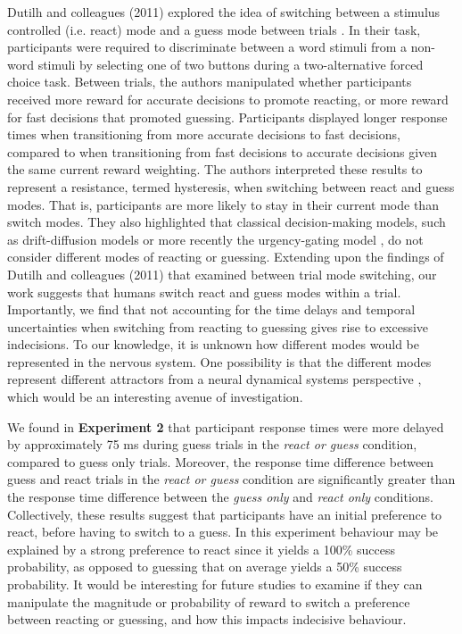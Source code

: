 \documentclass[man,donotrepeattitle,floatsintext,letterpaper,12pt]{apa7}
\newcommand\boldblue[1]{\textcolor{mydarkblue}{\textbf{#1}}}
\begin{document}
Dutilh and colleagues (2011) explored the idea of switching between a stimulus controlled (i.e. react) mode and a guess mode between trials \autocite{dutilhPhaseTransitionModel2011}. In their task, participants were required to discriminate between a word stimuli from a non-word stimuli by selecting one of two buttons during a two-alternative forced choice task. Between trials, the authors manipulated whether participants received more reward for accurate decisions to promote reacting, or more reward for fast decisions that promoted guessing. Participants displayed longer response times when transitioning from more accurate decisions to fast decisions, compared to when transitioning from fast decisions to accurate decisions given the same current reward weighting. The authors interpreted these results to represent a resistance, termed hysteresis, when switching between react and guess modes. That is, participants are more likely to stay in their current mode than switch modes. They also highlighted that classical decision-making models, such as drift-diffusion models \autocite{ratcliffModeling2alternativeForcedchoice2018} or more recently the urgency-gating model \autocite{cisekDecisionsChangingConditions2009,derosiereTradingAccuracySpeed2021,thuraDecisionMakingUrgency2012}, do not consider different modes of reacting or guessing. Extending upon the findings of Dutilh and colleagues (2011) that examined between trial mode switching, our work suggests that humans switch react and guess modes within a trial. Importantly, we find that not accounting for the time delays and temporal uncertainties when switching from reacting to guessing gives rise to excessive indecisions. To our knowledge, it is unknown how different modes would be represented in the nervous system. One possibility is that the different modes represent different attractors from a neural dynamical systems perspective \autocite{erlhagenDynamicFieldTheory2002,wangDecisionMakingRecurrent2008,churchlandNeuralPopulationDynamics2012,shenoyCorticalControlArm2013}, which would be an interesting avenue of investigation.

We found in \boldblue{Experiment 2} that participant response times were more delayed by approximately 75 ms during guess trials in the \emph{react or guess} condition, compared to guess only trials. Moreover, the response time difference between guess and react trials in the \emph{react or guess} condition are significantly greater than the response time difference between the \emph{guess only} and \emph{react only} conditions. Collectively, these results suggest that participants have an initial preference to react, before having to switch to a guess. In this experiment behaviour may be explained by a strong preference to react since it yields a 100\% success probability, as opposed to guessing that on average yields a 50\% success probability. It would be interesting for future studies to examine if they can manipulate the magnitude or probability of reward to switch a preference between reacting or guessing, and how this impacts indecisive behaviour.
\end{document}
